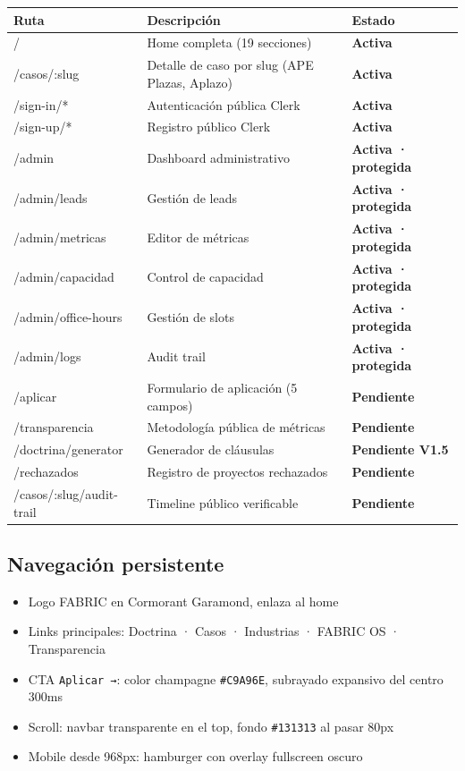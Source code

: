 \documentclass[11pt, a4paper]{article}
\newcommand{\token}[1]{\texttt{\color{accent}#1}}
\begin{document}
\begin{table}[h]
\centering
\begin{tabularx}{\linewidth}{>{\ttfamily\color{accent2}}l X >{\small\bfseries}l}
\toprule
Ruta & Descripción & Estado \\
\midrule
/ & Home completa (19 secciones) & \color{accent}Activa \\
/casos/:slug & Detalle de caso por slug (APE Plazas, Aplazo) & \color{accent}Activa \\
/sign-in/* & Autenticación pública Clerk & \color{accent}Activa \\
/sign-up/* & Registro público Clerk & \color{accent}Activa \\
/admin & Dashboard administrativo & \color{accent}Activa · protegida \\
/admin/leads & Gestión de leads & \color{accent}Activa · protegida \\
/admin/metricas & Editor de métricas & \color{accent}Activa · protegida \\
/admin/capacidad & Control de capacidad & \color{accent}Activa · protegida \\
/admin/office-hours & Gestión de slots & \color{accent}Activa · protegida \\
/admin/logs & Audit trail & \color{accent}Activa · protegida \\
/aplicar & Formulario de aplicación (5 campos) & \color{danger}Pendiente \\
/transparencia & Metodología pública de métricas & \color{danger}Pendiente \\
/doctrina/generator & Generador de cláusulas & \color{danger}Pendiente V1.5 \\
/rechazados & Registro de proyectos rechazados & \color{danger}Pendiente \\
/casos/:slug/audit-trail & Timeline público verificable & \color{danger}Pendiente \\
\bottomrule
\end{tabularx}
\end{table}

\subsection{Navegación persistente}

\begin{itemize}[leftmargin=*]
  \item Logo FABRIC en Cormorant Garamond, enlaza al home
  \item Links principales: Doctrina · Casos · Industrias · FABRIC OS · Transparencia
  \item CTA \texttt{Aplicar →}: color champagne \token{\#C9A96E}, subrayado expansivo del centro 300ms
  \item Scroll: navbar transparente en el top, fondo \token{\#131313} al pasar 80px
  \item Mobile desde 968px: hamburger con overlay fullscreen oscuro
\end{itemize}
\end{document}
